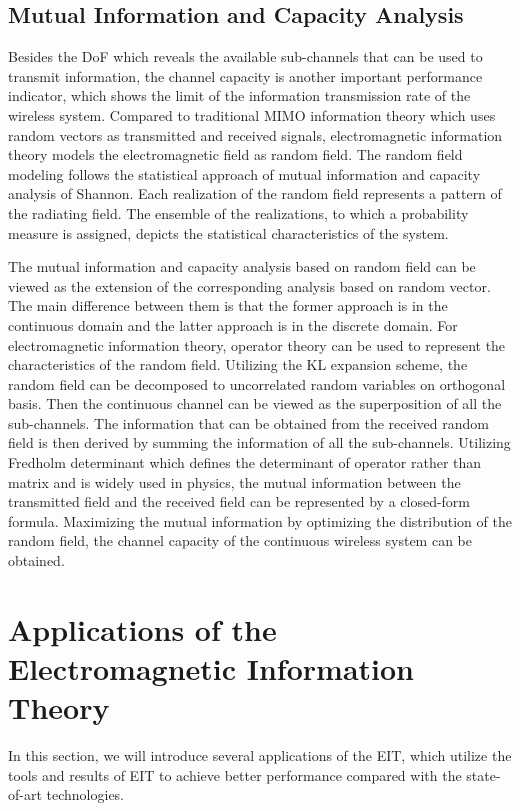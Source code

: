 \documentclass[journal,twocolumn]{IEEEtran}
\begin{document}
\subsection{Mutual Information and Capacity Analysis}
Besides the DoF which reveals the available sub-channels that can be used to transmit information, the channel capacity is another important performance indicator, which shows the limit of the information transmission rate of the wireless system. Compared to traditional MIMO information theory which uses random vectors as transmitted and received signals, electromagnetic information theory models the electromagnetic field as random field. The random field modeling follows the statistical approach of mutual information and capacity analysis of Shannon. Each realization of the random field represents a pattern of the radiating field. The ensemble of the realizations, to which a probability measure is assigned, depicts the statistical characteristics of the system. 

The mutual information and capacity analysis based on random field can be viewed as the extension of the corresponding analysis based on random vector. The main difference between them is that the former approach is in the continuous domain and the latter approach is in the discrete domain. For electromagnetic information theory, operator theory can be used to represent the characteristics of the random field. 
Utilizing the KL expansion scheme, the random field can be decomposed to uncorrelated random variables on orthogonal basis. Then the continuous channel can be viewed as the superposition of all the sub-channels. The information that can be obtained from the received random field is then derived by summing the information of all the sub-channels. Utilizing Fredholm determinant which defines the determinant of operator rather than matrix and is widely used in physics, the mutual information between the transmitted field and the received field can be represented by a closed-form formula. Maximizing the mutual information by optimizing the distribution of the random field, the channel capacity of the continuous wireless system can be obtained. 

\section{Applications of the Electromagnetic Information Theory}
In this section, we will introduce several applications of the EIT, which utilize the tools and results of EIT to achieve better performance compared with the state-of-art technologies.
\end{document}
